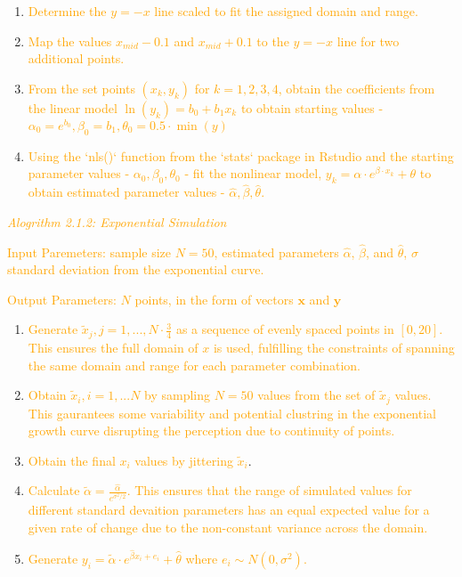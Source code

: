 \documentclass[]{interact}
\theoremstyle{plain}%
\theoremstyle{definition}
\theoremstyle{remark}
\begin{document}
\begin{enumerate}
\def\labelenumi{\arabic{enumi}.}
\item
  \textcolor{Orange}{Determine the $y=-x$ line scaled to fit the assigned domain and range.}
\item
  \textcolor{Orange}{Map the values $x_{mid} - 0.1$ and $x_{mid} + 0.1$ to the $y=-x$ line for two additional points.}
\item
  \textcolor{Orange}{From the set points $(x_k, y_k)$ for $k = 1,2,3,4$, obtain the coefficients from the linear model $\ln(y_k) = b_0 +b_1x_k$ to obtain starting values - $\alpha_0 = e^{b_0}, \beta_0 =  b_1, \theta_0 = 0.5\cdot \min(y)$}
\item
  \textcolor{Orange}{Using the `nls()` function from the `stats` package in Rstudio and the starting parameter values - $\alpha_0, \beta_0, \theta_0$ - fit the nonlinear model, $y_k = \alpha\cdot e^{\beta\cdot x_k}+\theta$ to obtain estimated parameter values - $\hat\alpha, \hat\beta, \hat\theta.$}
\end{enumerate}

\textcolor{Orange}{\textit{Alogrithm 2.1.2: Exponential Simulation}}

\textcolor{Orange}{Input Paremeters: sample size $N = 50$, estimated parameters $\hat\alpha$, $\hat\beta$, and $\hat\theta$, $\sigma$ standard deviation from the exponential curve.}

\textcolor{Orange}{Output Parameters: $N$ points, in the form of vectors $\mathbf{x}$ and $\mathbf{y}$}

\begin{enumerate}
\def\labelenumi{\arabic{enumi}.}
\item
  \textcolor{Orange}{Generate $\tilde x_j, j = 1,..., N\cdot \frac{3}{4}$ as a sequence of evenly spaced points in $[0,20]$. This ensures the full domain of $x$ is used, fulfilling the constraints of spanning the same domain and range for each parameter combination.}
\item
  \textcolor{Orange}{Obtain $\tilde x_i, i = 1,...N$ by sampling $N = 50$ values from the set of $\tilde x_j$ values. This gaurantees some variability and potential clustring in the exponential growth curve disrupting the perception due to continuity of points.}
\item
  \textcolor{Orange}{Obtain the final $x_i$ values by jittering $\tilde x_i$}.
\item
  \textcolor{Orange}{Calculate $\tilde\alpha = \frac{\hat\alpha}{e^{\sigma^2/2}}.$ This ensures that the range of simulated values for different standard devaition parameters has an equal expected value for a given rate of change due to the non-constant variance across the domain.}
\item
  \textcolor{Orange}{Generate $y_i = \tilde\alpha\cdot e^{\hat\beta x_i + e_i}+\hat\theta$ where $e_i\sim N(0,\sigma^2).$}
\end{enumerate}
\end{document}
